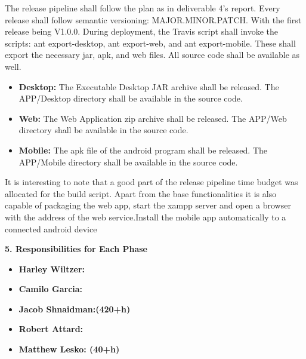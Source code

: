 \documentclass[12pt]{article}
\begin{document}
The release pipeline shall follow the plan as in deliverable 4's report. Every release shall follow semantic versioning: MAJOR.MINOR.PATCH. With the first release being V1.0.0. During deployment, the Travis script shall invoke the scripts: ant export-desktop, ant export-web, and ant export-mobile. These shall export the necessary jar, apk, and web files. All source code shall be available as well.
\begin{itemize}
	\item \textbf{Desktop:} The Executable Desktop JAR archive shall be released. The APP/Desktop directory shall be available in the source code.
	\item \textbf{Web:} The Web Application zip archive shall be released. The APP/Web directory shall be available in the source code.
	\item \textbf{Mobile:} The apk file of the android program shall be released. The APP/Mobile directory shall be available in the source code.
\end{itemize}

It is interesting to note that a good part of the release pipeline time budget was allocated for the build script. Apart from the base functionalities it is also capable of packaging the web app, start the xampp server and open a browser with the address of the web service.Install the mobile app automatically to a connected android device

\textbf{5. Responsibilities for Each Phase}
\begin{itemize}
    \item \textbf{Harley Wiltzer: }
    \item \textbf{Camilo Garcia: }
    \item \textbf{Jacob Shnaidman:(420+h) }
    \item \textbf{Robert Attard: }
    \item \textbf{Matthew Lesko: (40+h)} 
\end{itemize}
\end{document}
